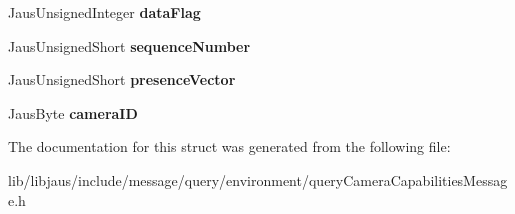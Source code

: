 \begin{DoxyCompactItemize}
\item 
\hypertarget{struct_query_camera_capabilities_message_struct_abb5ce12f5f06c26098d0f275660a718b}{\-Jaus\-Unsigned\-Integer {\bfseries data\-Flag}}\label{struct_query_camera_capabilities_message_struct_abb5ce12f5f06c26098d0f275660a718b}

\item 
\hypertarget{struct_query_camera_capabilities_message_struct_a583967a34bd39e1aee4928141b22e19a}{\-Jaus\-Unsigned\-Short {\bfseries sequence\-Number}}\label{struct_query_camera_capabilities_message_struct_a583967a34bd39e1aee4928141b22e19a}

\item 
\hypertarget{struct_query_camera_capabilities_message_struct_a1e643e544155c79657725b3e2b06f00a}{\-Jaus\-Unsigned\-Short {\bfseries presence\-Vector}}\label{struct_query_camera_capabilities_message_struct_a1e643e544155c79657725b3e2b06f00a}

\item 
\hypertarget{struct_query_camera_capabilities_message_struct_a64cede31ca917bf115842a261330a537}{\-Jaus\-Byte {\bfseries camera\-I\-D}}\label{struct_query_camera_capabilities_message_struct_a64cede31ca917bf115842a261330a537}

\end{DoxyCompactItemize}


\-The documentation for this struct was generated from the following file\-:\begin{DoxyCompactItemize}
\item 
lib/libjaus/include/message/query/environment/query\-Camera\-Capabilities\-Message.\-h\end{DoxyCompactItemize}
